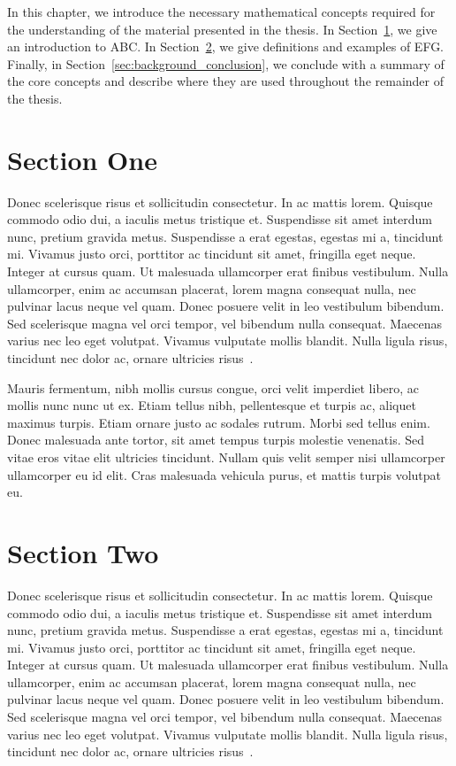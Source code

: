 In this chapter, we introduce the necessary mathematical concepts required for the understanding of the material presented in the thesis. In Section~\ref{sec:section_one}, we give an introduction to ABC. In Section~\ref{sec:section_two}, we give definitions and examples of EFG. Finally, in Section~\ref{sec:background_conclusion}, we conclude with a summary of the core concepts and describe where they are used throughout the remainder of the thesis.

\section{Section One}
\label{sec:section_one}

Donec scelerisque risus et sollicitudin consectetur. In ac mattis lorem. Quisque commodo odio dui, a iaculis metus tristique et. Suspendisse sit amet interdum nunc, pretium gravida metus. Suspendisse a erat egestas, egestas mi a, tincidunt mi. Vivamus justo orci, porttitor ac tincidunt sit amet, fringilla eget neque. Integer at cursus quam. Ut malesuada ullamcorper erat finibus vestibulum. Nulla ullamcorper, enim ac accumsan placerat, lorem magna consequat nulla, nec pulvinar lacus neque vel quam. Donec posuere velit in leo vestibulum bibendum. Sed scelerisque magna vel orci tempor, vel bibendum nulla consequat. Maecenas varius nec leo eget volutpat. Vivamus vulputate mollis blandit. Nulla ligula risus, tincidunt nec dolor ac, ornare ultricies risus~\cite{Gries1993aa}. \newline

Mauris fermentum, nibh mollis cursus congue, orci velit imperdiet libero, ac mollis nunc nunc ut ex. Etiam tellus nibh, pellentesque et turpis ac, aliquet maximus turpis. Etiam ornare justo ac sodales rutrum. Morbi sed tellus enim. Donec malesuada ante tortor, sit amet tempus turpis molestie venenatis. Sed vitae eros vitae elit ultricies tincidunt. Nullam quis velit semper nisi ullamcorper ullamcorper eu id elit. Cras malesuada vehicula purus, et mattis turpis volutpat eu.


\section{Section Two}
\label{sec:section_two}

Donec scelerisque risus et sollicitudin consectetur. In ac mattis lorem. Quisque commodo odio dui, a iaculis metus tristique et. Suspendisse sit amet interdum nunc, pretium gravida metus. Suspendisse a erat egestas, egestas mi a, tincidunt mi. Vivamus justo orci, porttitor ac tincidunt sit amet, fringilla eget neque. Integer at cursus quam. Ut malesuada ullamcorper erat finibus vestibulum. Nulla ullamcorper, enim ac accumsan placerat, lorem magna consequat nulla, nec pulvinar lacus neque vel quam. Donec posuere velit in leo vestibulum bibendum. Sed scelerisque magna vel orci tempor, vel bibendum nulla consequat. Maecenas varius nec leo eget volutpat. Vivamus vulputate mollis blandit. Nulla ligula risus, tincidunt nec dolor ac, ornare ultricies risus~\cite{Schmidt1993aa}. \newline

